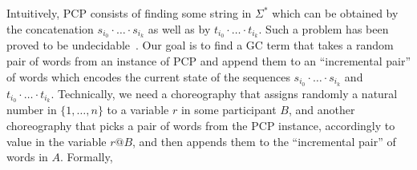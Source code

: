 \NI Intuitively, PCP consists of finding some string in $\Sigma^*$
which can be obtained by the concatenation $s_{i_0}\cdot \ldots \cdot
s_{i_k}$ as well as by $t_{i_0}\cdot \ldots \cdot t_{i_k}$. Such a
problem has been proved to be undecidable~\cite{Post:pcp}.
%
Our goal is to find a GC term that takes a random pair of words from
an instance of PCP and append them to an ``incremental pair'' of words
which encodes the current state of the sequences $s_{i_0}\cdot \ldots
\cdot s_{i_k}$ and $t_{i_0}\cdot \ldots \cdot t_{i_k}$.  Technically,
we need a choreography that assigns randomly a natural number in $\{1,
\dots, n\}$ to a variable $r$ in some participant $B$, and another
choreography that picks a pair of words from the PCP instance,
accordingly to value in the variable $r@B$, and then appends them to
the ``incremental pair'' of words in $A$.
Formally, %
